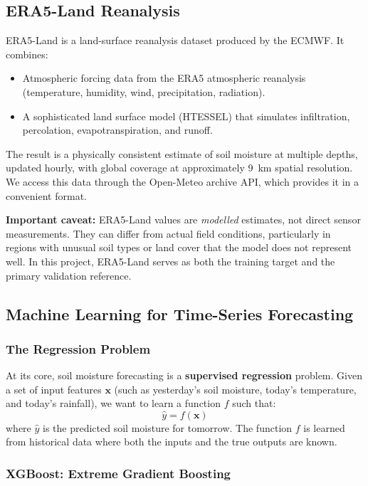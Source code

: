\documentclass[12pt, a4paper]{article}
\begin{document}
\subsection{ERA5-Land Reanalysis}

ERA5-Land is a land-surface reanalysis dataset produced by the ECMWF. It combines:

\begin{itemize}
    \item Atmospheric forcing data from the ERA5 atmospheric reanalysis (temperature, humidity, wind, precipitation, radiation).
    \item A sophisticated land surface model (HTESSEL) that simulates infiltration, percolation, evapotranspiration, and runoff.
\end{itemize}

The result is a physically consistent estimate of soil moisture at multiple depths, updated hourly, with global coverage at approximately 9~km spatial resolution. We access this data through the Open-Meteo archive API, which provides it in a convenient format.

\textbf{Important caveat:} ERA5-Land values are \textit{modelled} estimates, not direct sensor measurements. They can differ from actual field conditions, particularly in regions with unusual soil types or land cover that the model does not represent well. In this project, ERA5-Land serves as both the training target and the primary validation reference.

\subsection{Machine Learning for Time-Series Forecasting}

\subsubsection{The Regression Problem}

At its core, soil moisture forecasting is a \textbf{supervised regression} problem. Given a set of input features $\mathbf{x}$ (such as yesterday's soil moisture, today's temperature, and today's rainfall), we want to learn a function $f$ such that:
\[
\hat{y} = f(\mathbf{x})
\]
where $\hat{y}$ is the predicted soil moisture for tomorrow. The function $f$ is learned from historical data where both the inputs and the true outputs are known.

\subsubsection{XGBoost: Extreme Gradient Boosting}
\end{document}
